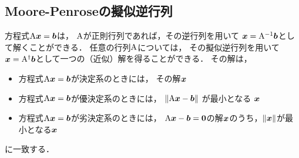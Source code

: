   \subsection{Moore-Penroseの擬似逆行列}
    方程式$\mathrm{A}\boldsymbol{x} = \boldsymbol{b}$は，
    $\mathrm{A}$が正則行列であれば，その逆行列を用いて
    $\boldsymbol{x} = \mathrm{A}^{-1}\boldsymbol{b}$として解くことができる．
    任意の行列$\mathrm{A}$については，
    その擬似逆行列を用いて
    $\boldsymbol{x} = \mathrm{A}^\dagger\boldsymbol{b}$として一つの（近似）解を得ることができる．
    その解は，
    \begin{itemize}[nosep]
      \item 方程式$\mathrm{A}\boldsymbol{x} = \boldsymbol{b}$が決定系のときには，
        その解$\boldsymbol{x}$
      \item 方程式$\mathrm{A}\boldsymbol{x} = \boldsymbol{b}$が優決定系のときには，
        $\|\mathrm{A} \boldsymbol{x} - \boldsymbol{b} \|$ が最小となる $\boldsymbol{x}$
      \item 方程式$\mathrm{A}\boldsymbol{x} = \boldsymbol{b}$が劣決定系のときには，
        $\mathrm{A} \boldsymbol{x} - \boldsymbol{b} = \boldsymbol{0}$の解$\boldsymbol{x}$のうち，$\|\boldsymbol{x}\|$が最小となる$\boldsymbol{x}$
    \end{itemize}
    に一致する．
    
